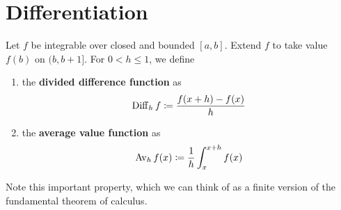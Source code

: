 \section{Differentiation}

  \begin{definition}
    \label{def:divided-difference-average-value}
    Let $f$ be integrable over closed and bounded $[a, b]$. Extend $f$ to take value $f(b)$ on $(b, b +1]$. For $0 < h \leq 1$, we define 
    \begin{enumerate}
      \item the \textbf{divided difference function} as 
        \begin{equation}
          \operatorname{Diff}_h f \coloneqq \frac{f(x + h) - f(x)}{h}
        \end{equation} 
        
      \item the \textbf{average value function} as 
        \begin{equation}
          \operatorname{Av}_h f(x) \coloneqq \frac{1}{h} \int_x^{x + h} f(x)
        \end{equation}
    \end{enumerate}
  \end{definition} 

  Note this important property, which we can think of as a finite version of the fundamental theorem of calculus. 

